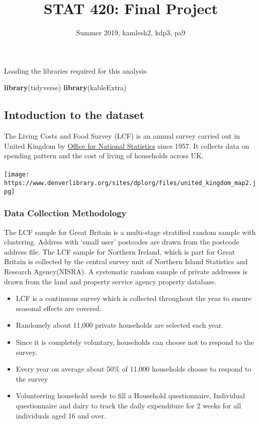\documentclass[]{article}
\title{STAT 420: Final Project}
\author{Summer 2019, kamlesh2, kdp3, pa9}
\date{}
\newenvironment{Shaded}{\begin{snugshade}}{\end{snugshade}}
\newcommand{\KeywordTok}[1]{\textcolor[rgb]{0.13,0.29,0.53}{\textbf{#1}}}
\newcommand{\NormalTok}[1]{#1}
\begin{document}
\maketitle

Loading the libraries required for this analysis

\begin{Shaded}
\begin{Highlighting}[]
\KeywordTok{library}\NormalTok{(tidyverse)}
\KeywordTok{library}\NormalTok{(kableExtra)}
\end{Highlighting}
\end{Shaded}

\hypertarget{intoduction-to-the-dataset}{%
\subsection{Intoduction to the
dataset}\label{intoduction-to-the-dataset}}

The Living Costs and Food Survey (LCF) is an annual survey carried out
in United Kingdom by \href{https://www.ons.gov.uk/}{Office for National
Statistics} since 1957. It collects data on spending pattern and the
cost of living of households across UK.\\
~\\

\texttt{[image: https://www.denverlibrary.org/sites/dplorg/files/united\_kingdom\_map2.jpg]}

\hypertarget{data-collection-methodology}{%
\subsubsection{Data Collection
Methodology}\label{data-collection-methodology}}

The LCF sample for Great Britain is a multi-stage stratified random
sample with clustering. Address with `small user' postcodes are drawn
from the postcode address file. The LCF sample for Northern Ireland,
which is part for Great Britain is collected by the central survey unit
of Northern Island Statistics and Research Agency(NISRA). A systematic
random sample of private addresses is drawn from the land and property
service agency property database.

\begin{itemize}
\item
  LCF is a continuous survey which is collected throughout the year to
  ensure seasonal effects are covered.
\item
  Randomely about 11,000 private households are selected each year.
\item
  Since it is completely voluntary, households can choose not to respond
  to the survey.
\item
  Every year on average about 50\% of 11,000 households choose to
  respond to the survey
\item
  Volunteering household needs to fill a Household questionnaire,
  Individual questionnaire and dairy to track the daily expenditure for
  2 weeks for all individuals aged 16 and over.
\end{itemize}
\end{document}
